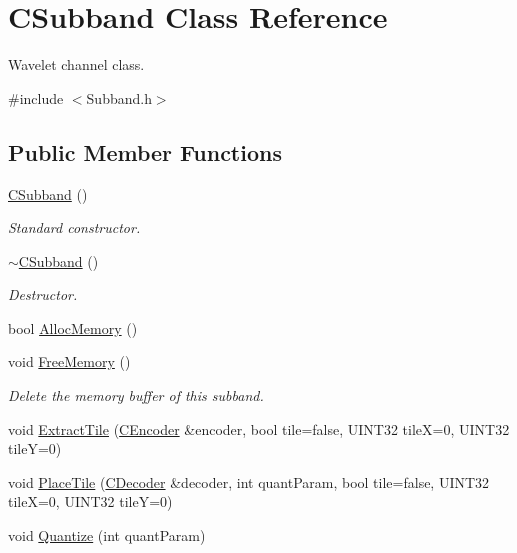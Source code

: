 \hypertarget{classCSubband}{}\section{C\+Subband Class Reference}
\label{classCSubband}


Wavelet channel class.  




{\ttfamily \#include $<$Subband.\+h$>$}

\subsection*{Public Member Functions}
\begin{DoxyCompactItemize}
\item 
\mbox{\hyperlink{classCSubband_afa9c10af42bd47d2b001e90dfd1031b5}{C\+Subband}} ()
\begin{DoxyCompactList}\small\item\em Standard constructor. \end{DoxyCompactList}\item 
\mbox{\hyperlink{classCSubband_aea6470d90e54f665e0bc7392fad0dd82}{$\sim$\+C\+Subband}} ()
\begin{DoxyCompactList}\small\item\em Destructor. \end{DoxyCompactList}\item 
bool \mbox{\hyperlink{classCSubband_a2c98d1e4d2586adcda289c6e358b94f6}{Alloc\+Memory}} ()
\item 
void \mbox{\hyperlink{classCSubband_a62f1ed27fe4771e2f10f58a0eeafd7b1}{Free\+Memory}} ()
\begin{DoxyCompactList}\small\item\em Delete the memory buffer of this subband. \end{DoxyCompactList}\item 
void \mbox{\hyperlink{classCSubband_a85cb6f480676ba18999f66e682370d65}{Extract\+Tile}} (\mbox{\hyperlink{classCEncoder}{C\+Encoder}} \&encoder, bool tile=false, U\+I\+N\+T32 tileX=0, U\+I\+N\+T32 tileY=0)
\item 
void \mbox{\hyperlink{classCSubband_af109a0516ded3bea57348a0f4318c2fb}{Place\+Tile}} (\mbox{\hyperlink{classCDecoder}{C\+Decoder}} \&decoder, int quant\+Param, bool tile=false, U\+I\+N\+T32 tileX=0, U\+I\+N\+T32 tileY=0)
\item 
void \mbox{\hyperlink{classCSubband_a5de71c37eb00e5e5dad3fe5e38b81ced}{Quantize}} (int quant\+Param)
\item 

\end{DoxyCompactItemize}
